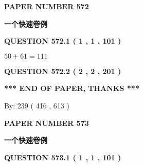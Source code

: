 \documentclass{ctexart}
\begin{document}
   
 {\textbf{ \Large{ PAPER NUMBER  572  }}}
   
   
\vspace{0.2in}
   
   
   
   
   
   
 \vspace{0.2in}
{\LARGE {\textbf{ 一个快速卷例}}}
   
   
  
\vspace{0.2in}
  
{\textbf{\Large{QUESTION
572.1 
 ( 1 , 1 , 101 )
}}}
  
  
 
 

$ %
50 +  %
61=   %
111$
 
 
  
\vspace{0.2in}
  
{\textbf{\Large{QUESTION
572.2 
 ( 2 , 2 , 201 )
}}}
  
  
   
   
 \vspace{0.2in}
 
   
   
   
   
\vspace{1.0in} 
{\textbf{\large{ *** END OF PAPER, THANKS *** }}} 
   
   
\hspace{1.0in} By: 
 239 ( 416 ,  613 )
   
   
   
   
\newpage 
\setcounter{page}{ 
   573001 } 
   
   
   
   
 {\textbf{ \Large{ PAPER NUMBER  573  }}}
   
   
\vspace{0.2in}
   
   
   
   
   
   
 \vspace{0.2in}
{\LARGE {\textbf{ 一个快速卷例}}}
   
   
  
\vspace{0.2in}
  
{\textbf{\Large{QUESTION
573.1 
 ( 1 , 1 , 101 )
}}}
  
\end{document}
